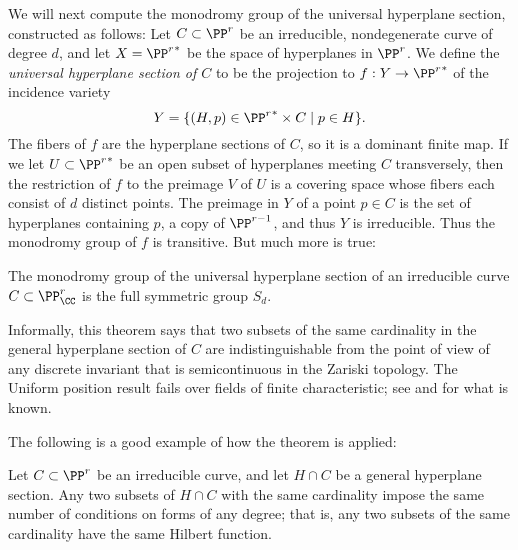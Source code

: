 We will next compute the monodromy group of the  universal hyperplane section, constructed as follows:
Let $C \subset \PP^r$ be an irreducible, nondegenerate curve of degree $d$, and let $X = {\PP^r}^*$ be the space of hyperplanes in $\PP^r$. We define the \emph{universal hyperplane section of $C$} to be the projection to $f: Y\to {\PP^r}^*$ of the incidence variety
$$
Y = \{ (H, p) \in {\PP^r}^* \times C \mid p \in H \}.
$$
The fibers of $f$ are the hyperplane
sections of $C$, so it is a dominant finite map. If we let $U\subset {\PP^r}^*$ be an open subset of hyperplanes
meeting $C$ transversely, then the restriction of $f$ to the preimage $V$ of $U$ is a covering space
whose fibers each consist of $d$ distinct points. The preimage in $Y$ of a point $p\in C$ is the set of hyperplanes containing
$p$, a copy of $\PP^{r-1}$, and thus $Y$ is irreducible. Thus the monodromy group of $f$ is transitive. But much more is true:

\begin{theorem}\label{uniform position lemma}
The monodromy group of the universal hyperplane section of an irreducible curve $C \subset \PP^r_\CC$ is the full symmetric group $S_d$.
\end{theorem}

Informally, this theorem says that two subsets of the same cardinality in the general hyperplane section of $C$
are indistinguishable from the point of view of any discrete invariant that is semicontinuous in the Zariski topology. 
The Uniform position result fails over fields of finite characteristic; see \cite{Rathmann} and \cite{Kadets} for what is known. 

The following is a good example of how the theorem is applied:

\begin{corollary}\label{numerical uniform position lemma}
Let $C\subset \PP^r$ be an irreducible curve, and let $H\cap C$ be a general hyperplane section. Any two subsets of $H\cap C$ with the same cardinality impose the same number of conditions on forms of any degree; that is, any two subsets of the same cardinality have the same Hilbert function.
\end{corollary}

